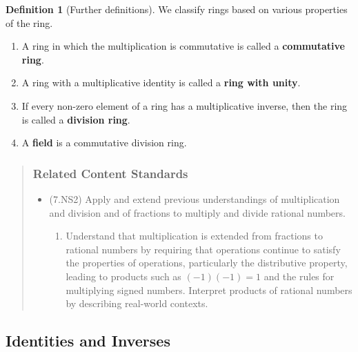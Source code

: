 \documentclass[
]{book}
\providecommand{\tightlist}{%
  \setlength{\itemsep}{0pt}\setlength{\parskip}{0pt}}
\theoremstyle{definition}
\newtheorem{definition}{Definition}[chapter]
\theoremstyle{definition}
\theoremstyle{definition}
\theoremstyle{remark}
\begin{document}
\begin{definition}[Further definitions]
\protect\hypertarget{def:unnamed-chunk-168}{}{\label{def:unnamed-chunk-168} {} }We classify rings based on various properties of the ring.

\begin{enumerate}
\def\labelenumi{\arabic{enumi}.}
\tightlist
\item
  A ring in which the multiplication is commutative is called a \textbf{commutative ring}.
\item
  A ring with a multiplicative identity is called a \textbf{ring with unity}.
\item
  If every non-zero element of a ring has a multiplicative inverse, then the ring is called a \textbf{division ring}.
\item
  A \textbf{field} is a commutative division ring.
\end{enumerate}
\end{definition}

\begin{quote}
\hypertarget{related-content-standards-27}{%
\subsubsection*{Related Content Standards}\label{related-content-standards-27}}

\begin{itemize}
\tightlist
\item
  (7.NS2) Apply and extend previous understandings of multiplication and division and of fractions to multiply and divide rational numbers.

  \begin{enumerate}
  \def\labelenumi{\alph{enumi}.}
  \tightlist
  \item
    Understand that multiplication is extended from fractions to rational numbers by requiring that operations continue to satisfy the properties of operations, particularly the distributive property, leading to products such as \((-1)(-1) = 1\) and the rules for multiplying signed numbers. Interpret products of rational numbers by describing real-world contexts.
  \end{enumerate}
\end{itemize}
\end{quote}

\hypertarget{identities-and-inverses}{%
\subsection{Identities and Inverses}\label{identities-and-inverses}}
\end{document}
